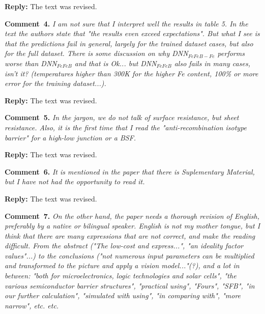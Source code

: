 \documentclass[num-refs]{wiley-article} %
\begin{document}
\vspace{0.5cm}
\noindent
\textcolor[rgb]{0.51,0.00,0.00}{\textbf{Reply:}}
The text was revised.

\vspace{1cm}
\noindent
\textcolor[rgb]{0.00,0.50,1.00}{\textbf{Comment~4.}}
\emph{I am not sure that I interpret well the results in table 5.
In the text the authors state that "the results even exceed expectations".
But what I see is that the predictions fail in general, largely for the trained dataset cases, but also for the full dataset.
There is some discussion on why DNN$_{FeFeB-Fe}$ performs worse than DNN$_{FeFeB}$ and that is Ok... but DNN$_{FeFeB}$ also fails in many cases, isn't it?
(temperatures higher than 300K for the higher Fe content, 100\% or more error for the training dataset...).
}

\vspace{0.5cm}
\noindent
\textcolor[rgb]{0.51,0.00,0.00}{\textbf{Reply:}}
The text was revised.

\vspace{1cm}
\noindent
\textcolor[rgb]{0.00,0.50,1.00}{\textbf{Comment~5.}}
\emph{In the jargon, we do not talk of surface resistance, but sheet resistance.
Also, it is the first time that I read the "anti-recombination isotype barrier" for a high-low junction or a BSF.}

\vspace{0.5cm}
\noindent
\textcolor[rgb]{0.51,0.00,0.00}{\textbf{Reply:}}
The text was revised.

\vspace{1cm}
\noindent
\textcolor[rgb]{0.00,0.50,1.00}{\textbf{Comment~6.}}
\emph{It is mentioned in the paper that there is Suplementary Material, but I have not had the opportunity to read it.}

\vspace{0.5cm}
\noindent
\textcolor[rgb]{0.51,0.00,0.00}{\textbf{Reply:}}
The text was revised.


\vspace{1cm}
\noindent
\textcolor[rgb]{0.00,0.50,1.00}{\textbf{Comment~7.}}
\emph{On the other hand, the paper needs a thorough revision of English, preferably by a native or bilingual speaker.
English is not my mother tongue, but I think that there are many expressions that are not correct, and make the reading difficult.
From the abstract ("The low-cost and express...", "an ideality factor values"...)
to the conclusions ("not numerous input parameters can be multiplied and transformed to the picture and apply a vision model..."(?),
and a lot in between: "both for microelectronics, logic technologies and solar cells",
"the various semiconductor barrier structures", "practical using", "Fours", "SFB", "in our further calculation",
"simulated with using", "in comparing with", "more narrow", etc. etc. }
\end{document}

